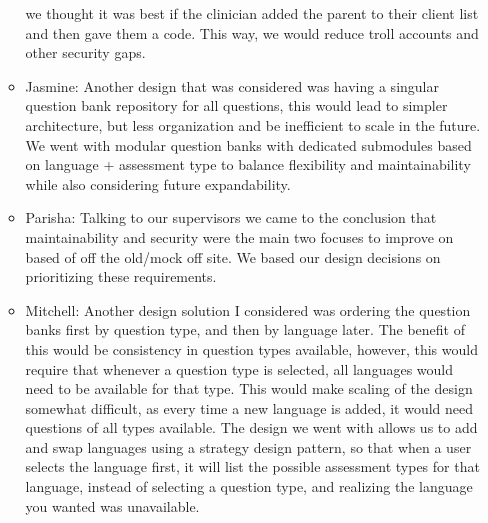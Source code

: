 \documentclass[12pt, titlepage]{article}
\begin{document}
\begin{enumerate}
\begin{itemize}
    we thought it was best if the clinician added the parent to their client list and then gave them a code. This way, we would reduce troll accounts and other security gaps.
    \item Jasmine: Another design that was considered was having a singular question bank repository for all questions, this would lead to simpler architecture, but less organization and be inefficient to scale in the future.
    We went with modular question banks with dedicated submodules based on language + assessment type to balance flexibility and maintainability while also considering future expandability.  
    \item Parisha: Talking to our supervisors we came to the conclusion that maintainability and security were the main two focuses to improve on based of off the old/mock off site. We based our design decisions on prioritizing these requirements.
    \item Mitchell: Another design solution I considered was ordering the question banks first by question type, and then by language later. The benefit of this would be consistency in question types available,
    however, this would require that whenever a question type is selected, all languages would need to be available for that type. This would make scaling of the design somewhat difficult, as every time a new language is added, it would need questions of all types
    available. The design we went with allows us to add and swap languages using a strategy design pattern, so that when a user selects the language first, it will list the possible assessment types for that language, instead of selecting a question type, and
    realizing the language you wanted was unavailable.

  \end{itemize}
  \end{enumerate}
\end{document}
